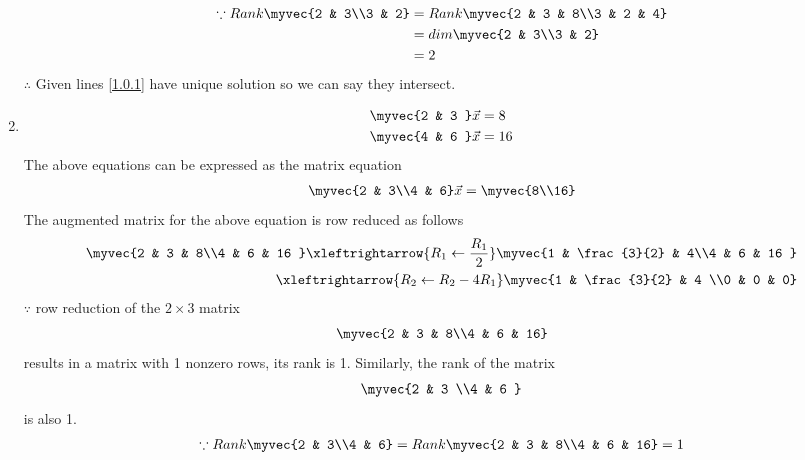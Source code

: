 \documentclass[journal,12pt,twocolumn]{IEEEtran}
\begin{document}
\begin{enumerate}
%
\begin{align}
\because Rank \myvec{2 & 3\\3 & 2} &= Rank\myvec{2 & 3 & 8\\3 & 2 & 4} \nonumber\\
 &=dim \myvec{2 & 3\\3 & 2}\nonumber\\
 &=2
\end{align}
$\therefore$ Given lines \eqref{1.0.1} have unique solution so we can say they intersect.
\item
\begin{align}
\begin{split}
\myvec{2 & 3 }\vec{x}&=8
\\
\myvec{4 & 6 }\vec{x}&=16
\end{split}
\end{align}
The above equations can be expressed as the matrix equation
\begin{align}
\myvec{2 & 3\\4 & 6} \vec{x} = \myvec{8\\16}
\end{align}
%
The augmented matrix for the above equation is row reduced as follows
\begin{align}
\myvec{2 & 3 & 8\\4 & 6 & 16 } 
\xleftrightarrow {R_1\leftarrow \frac{R_1}{2}}\myvec{1 & \frac{3}{2} & 4\\4 & 6 & 16 }
\\
\xleftrightarrow {R_2\leftarrow R_2-4R_1}\myvec{1 & \frac{3}{2} & 4 \\0 & 0 & 0}
\\
\end{align}
%
$\because$ row reduction of the $2\times 3$ matrix
%
\begin{align}
\myvec{2 & 3 & 8\\4 & 6 & 16}
\end{align}
%
results in a matrix with 1 nonzero rows, its rank is 1. 
%
Similarly, the rank of the matrix 
\begin{align}
\myvec{2 & 3 \\4 & 6 } 
\end{align}
%
is also 1.
%
\begin{align}
\because Rank \myvec{2 & 3\\4 & 6} &= Rank\myvec{2 & 3 & 8\\4 & 6 & 16}=1\nonumber\\

\end{align}
\end{enumerate}
\end{document}
